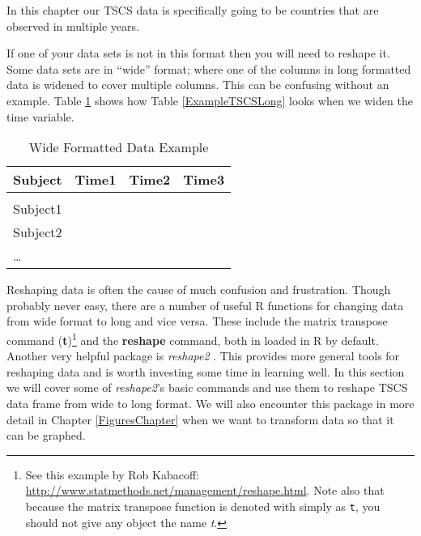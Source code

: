 \noindent In this chapter our TSCS data is specifically going to be countries that are observed in multiple years.

\noindent If one of your data sets is not in this format then you will need to reshape it. Some data sets are in ``wide'' format; where one of the columns in long formatted data is widened to cover multiple columns. This can be confusing without an example. Table \ref{ExampleWide} shows how Table \ref{ExampleTSCSLong} looks when we widen the time variable.

\begin{table}[h!]
    \caption{Wide Formatted Data Example}
    \label{ExampleWide}
    \begin{tabular}{l c c c}
        \\[0.15cm]
        \hline 
        Subject & Time1 & Time2 & Time3 \\
        \hline \\[0.1cm]
        Subject1 & & & \\[0.25cm]
        Subject2 & & & \\[0.25cm]
        \ldots & & & \\[0.25cm]
        \hline
    \end{tabular}
\end{table}

Reshaping data is often the cause of much confusion and frustration. Though probably never easy, there are a number of useful R functions for changing data from wide format to long and vice versa. These include the matrix transpose command (\textbf{t})\footnote{See this example by Rob Kabacoff: \url{http://www.statmethods.net/management/reshape.html}. Note also that because the matrix transpose function is denoted with simply as \texttt{t}, you should not give any object the name \emph{t}.} and the \textbf{reshape} command, both in loaded in R by default.  Another very helpful package is \emph{reshape2} \citep{R-reshape2}. This provides more general tools for reshaping data and is worth investing some time in learning well. In this section we will cover some of \emph{reshape2}'s basic commands and use them to reshape TSCS data frame from wide to long format. We will also encounter this package in more detail in Chapter \ref{FiguresChapter} when we want to transform data so that it can be graphed.

